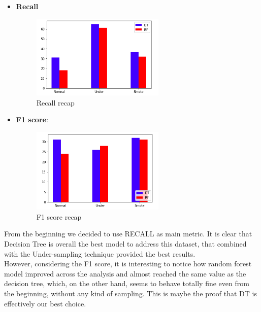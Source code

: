 \begin{itemize}
\item \textbf{Recall} 

\begin{figure}[H]
\centering
\includegraphics[width=0.6\textwidth]{Img/recall_recap.png}
\caption{Recall recap}
\end{figure}
\item \textbf{F1 score}: 

\begin{figure}[H]
\centering
\includegraphics[width=0.6\textwidth]{Img/recap_f1.png}
\caption{F1 score recap}
\end{figure}
\end{itemize}

\noindent From the beginning we decided to use RECALL as main metric. It is clear that Decision Tree is overall the best model to address this dataset, that combined with the Under-sampling technique provided the best results.\\
However, considering the F1 score, it is interesting to notice how random forest model improved across the analysis and almost reached the same value as the decision tree, which, on the other hand, seems to behave totally fine even from the beginning, without any kind of sampling. This is maybe the proof that DT is effectively our best choice.